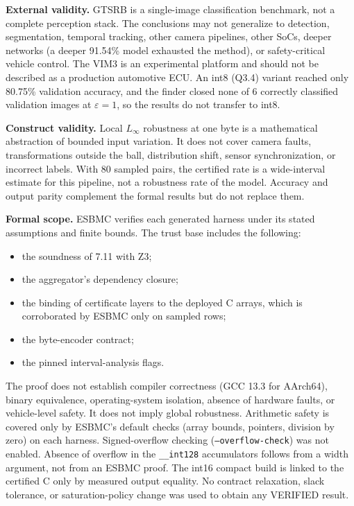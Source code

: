\textbf{External validity.} GTSRB is a single-image classification benchmark, not a complete perception stack. The conclusions may not generalize to detection, segmentation, temporal tracking, other camera pipelines, other SoCs, deeper networks (a deeper 91.54\% model exhausted the method), or safety-critical vehicle control. The VIM3 is an experimental platform and should not be described as a production automotive ECU. An int8 (Q3.4) variant reached only 80.75\% validation accuracy, and the finder closed none of 6 correctly classified validation images at $\varepsilon = 1$, so the results do not transfer to int8.

\textbf{Construct validity.} Local $L_\infty$ robustness at one byte is a mathematical abstraction of bounded input variation. It does not cover camera faults, transformations outside the ball, distribution shift, sensor synchronization, or incorrect labels. With 80 sampled pairs, the certified rate is a wide-interval estimate for this pipeline, not a robustness rate of the model. Accuracy and output parity complement the formal results but do not replace them.

\textbf{Formal scope.} ESBMC verifies each generated harness under its stated assumptions and finite bounds. The trust base includes the following:
\begin{itemize}
  \item the soundness of \ESBMC{} 7.11 with Z3;
  \item the aggregator's dependency closure;
  \item the binding of certificate layers to the deployed C arrays, which is corroborated by ESBMC only on sampled rows;
  \item the byte-encoder contract;
  \item the pinned interval-analysis flags.
\end{itemize}
The proof does not establish compiler correctness (GCC 13.3 for AArch64), binary equivalence, operating-system isolation, absence of hardware faults, or vehicle-level safety. It does not imply global robustness. Arithmetic safety is covered only by ESBMC's default checks (array bounds, pointers, division by zero) on each harness. Signed-overflow checking (\texttt{--overflow-check}) was not enabled. Absence of overflow in the \texttt{\_\_int128} accumulators follows from a width argument, not from an ESBMC proof. The int16 compact build is linked to the certified C only by measured output equality. No contract relaxation, slack tolerance, or saturation-policy change was used to obtain any VERIFIED result.
